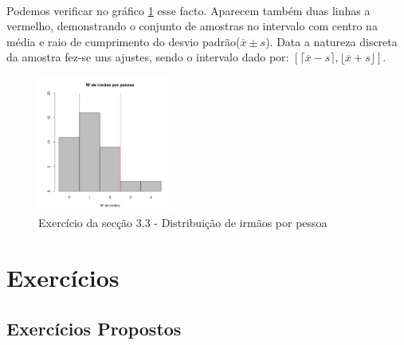 \documentclass[11pt,a4paper]{article}
\begin{document}
\paragraph{} Podemos verificar no gráfico \ref{fig:ex3_3} esse facto. Aparecem
também duas linhas a vermelho, demonstrando o conjunto de amostras no
intervalo com centro na média e raio de cumprimento do desvio
padrão($\overline{x} \pm s$). Data a natureza discreta da amostra fez-se uns
ajustes, sendo o intervalo dado por:
$[\lceil \overline{x} - s \rceil, \lfloor \overline{x} + s \rfloor]$.

\vspace{0.5cm}




\begin{figure}[h!]
	\centering
	\includegraphics[width=0.4\textwidth]{./recursos/ex3_3.png}
	\caption{Exercício da secção 3.3 - Distribuição de irmãos por pessoa}
	\label{fig:ex3_3}
\end{figure}

\clearpage
\section{Exercícios}
\subsection*{Exercícios Propostos}
\end{document}

